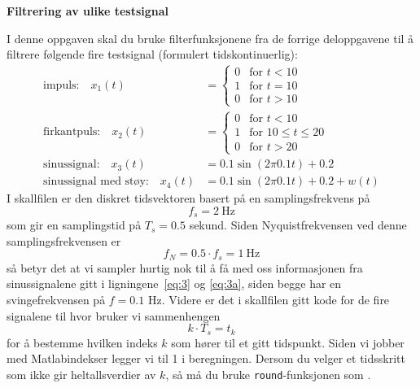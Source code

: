 \item \label{pkt:FIR_IIR}
  {\bf Filtrering av ulike testsignal}
  
I denne oppgaven skal du bruke filterfunksjonene fra de forrige
deloppgavene til å  filtrere følgende fire testsignal (formulert tidskontinuerlig):
\begin{align}
\text{impuls:} \quad  x_{1}(t) & =
      \begin{cases}%
  0 &\text{for } t<10\\
  1 &\text{for } t=10\\
   0& \text{for } t >10
 \end{cases}\\
\text{firkantpuls:} \quad  x_{2}(t) & =
      \begin{cases}%
  0 &\text{for } t<10\\
  1 &\text{for } 10\leq t \leq 20\\
   0& \text{for } t > 20
 \end{cases}\\
\text{sinussignal:} \quad   x_{3}(t) & = 0.1 \sin(2\pi 0.1 t)+0.2 \label{eq:3}\\
  \text{sinussignal med støy:} \quad   x_{4}(t) &
                                                  = 0.1 \sin(2\pi 0.1 t)+0.2 +w(t)\label{eq:3a}  
\end{align}
I skallfilen
er den diskret tidsvektoren
  basert på en samplingsfrekvens på
  \begin{equation}
    \label{eq:1511}
      f_{s} = 2~\text{Hz}
    \end{equation}
    som gir en samplingstid på $T_{s}{=}0.5$ sekund.
    Siden Nyquistfrekvensen ved denne samplingsfrekvensen er
    \begin{equation}
      \label{eq:1_fs}
      f_{N}= 0.5{\cdot} f_{s} = 1~\text{Hz}
    \end{equation}
    så betyr det at vi sampler hurtig nok til å få med oss informasjonen fra
    sinussignalene gitt i ligningene~\eqref{eq:3} og \eqref{eq:3a},
    siden begge har en svingefrekvensen på $f{=}0.1$ Hz. 
    Videre er det i skallfilen gitt kode for de fire signalene
     til   hvor bruker vi sammenhengen 
  \begin{equation}
    \label{eq:7}
    k{\cdot}T_{s} = t_{k}
  \end{equation}
  for å bestemme hvilken indeks $k$ som hører til et gitt tidspunkt.
  Siden vi jobber med Matlabindekser legger
  vi til 1 i beregningen. Dersom du velger et tidsskritt som ikke gir
  heltallsverdier av $k$, så må du bruke {\tt round}-funksjonen som
  .

